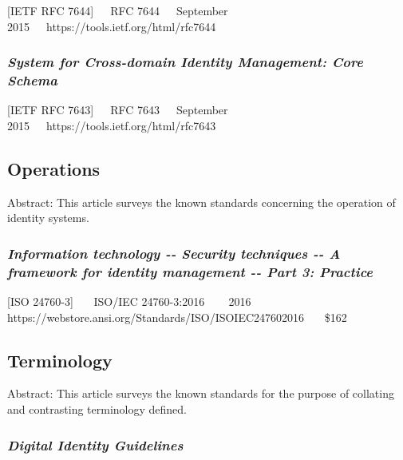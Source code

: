 {[}IETF RFC 7644{]}~~~RFC 7644~~~September
2015~~~https://tools.ietf.org/html/rfc7644

\hypertarget{system-for-cross-domain-identity-management-core-schema}{%
\subsubsection{\texorpdfstring{\emph{System for Cross-domain Identity
Management: Core
Schema}}{System for Cross-domain Identity Management: Core Schema}}\label{system-for-cross-domain-identity-management-core-schema}}

{[}IETF RFC 7643{]}~~~RFC 7643~~~September
2015~~~https://tools.ietf.org/html/rfc7643

\hypertarget{operations}{%
\subsection{Operations}\label{operations}}

Abstract: This article surveys the known standards concerning the
operation of identity systems.

\hypertarget{information-technology----security-techniques----a-framework-for-identity-management----part-3-practice}{%
\subsubsection{\texorpdfstring{\emph{Information technology -\/- Security
techniques -\/- A framework for identity management -\/- Part 3:
Practice}}{Information technology -\/- Security techniques -\/- A framework for identity management -\/- Part 3: Practice}}\label{information-technology----security-techniques----a-framework-for-identity-management----part-3-practice}}

{[}ISO 24760-3{]}~~~ ISO/IEC 24760-3:2016 ~~~ 2016~~~
https://webstore.ansi.org/Standards/ISO/ISOIEC247602016~~~ \$162

\hypertarget{terminology}{%
\subsection{Terminology}\label{terminology}}

Abstract: This article surveys the known standards for the purpose of
collating and contrasting terminology defined.

\hypertarget{digital-identity-guidelines-1}{%
\subsubsection{\texorpdfstring{\emph{Digital Identity
Guidelines}}{Digital Identity Guidelines}}\label{digital-identity-guidelines-1}}


